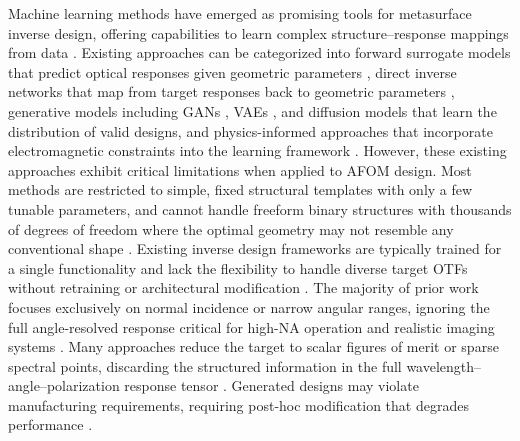 Machine learning methods have emerged as promising tools for metasurface inverse design, offering capabilities to learn complex structure--response mappings from data \cite{ma2021deep,liu2018training,so2019}. Existing approaches can be categorized into forward surrogate models that predict optical responses given geometric parameters \cite{ma2021deep,malkiel2018plasmonic}, direct inverse networks that map from target responses back to geometric parameters \cite{liu2018training,an2019deep}, generative models including GANs \cite{liu2018,ma2021}, VAEs \cite{ma2019probabilistic}, and diffusion models \cite{hen2026,tanriover2023} that learn the distribution of valid designs, and physics-informed approaches that incorporate electromagnetic constraints into the learning framework \cite{chen2021physics,huang2022meta}. However, these existing approaches exhibit critical limitations when applied to AFOM design. Most methods are restricted to simple, fixed structural templates with only a few tunable parameters, and cannot handle freeform binary structures with thousands of degrees of freedom where the optimal geometry may not resemble any conventional shape \cite{ma2021deep,malkiel2018plasmonic}. Existing inverse design frameworks are typically trained for a single functionality and lack the flexibility to handle diverse target OTFs without retraining or architectural modification \cite{an2019deep,jiang2021}. The majority of prior work focuses exclusively on normal incidence or narrow angular ranges, ignoring the full angle-resolved response critical for high-NA operation and realistic imaging systems \cite{kwon2018,zhou2025laplace}. Many approaches reduce the target to scalar figures of merit or sparse spectral points, discarding the structured information in the full wavelength--angle--polarization response tensor \cite{liu2018training}. Generated designs may violate manufacturing requirements, requiring post-hoc modification that degrades performance \cite{phillips2021ensemble}.

